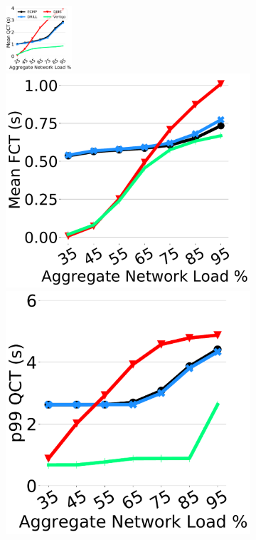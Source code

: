 \begin{figure}[th!]
	\centering
	\begin{subfigure}[t]{.32\linewidth}
	\centering
	\includegraphics[width=0.85\linewidth, height=2.4cm]{figs/qps25.pdf}
	\includegraphics[width=0.85\linewidth]{figs/qps25fct.pdf}
	\includegraphics[width=0.85\linewidth]{figs/qps25p99qct.pdf}

\end{subfigure}
\end{figure}
